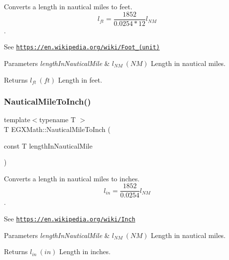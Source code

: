 Converts a length in nautical miles to feet. \[ l_{ft}= \frac{1852}{0.0254 * 12} l_{NM} \]. 

See \href{https://en.wikipedia.org/wiki/Foot_(unit)}{\tt https\+://en.\+wikipedia.\+org/wiki/\+Foot\+\_\+(unit)} 
\begin{DoxyParams}{Parameters}
{\em length\+In\+Nautical\+Mile} & $ l_{NM}\ (NM)$ Length in nautical miles. \\
\hline
\end{DoxyParams}
\begin{DoxyReturn}{Returns}
$ l_{ft}\ (ft)$ Length in feet. 
\end{DoxyReturn}
\mbox{\label{group___e_g_x_math-_conversions-_length_conversions-_non-_s_i-_nautical_mile-_imperial_ga5ec58ed7dbd23bcfb8290e1e476f354b}} 
\subsubsection{\texorpdfstring{Nautical\+Mile\+To\+Inch()}{NauticalMileToInch()}}
{\footnotesize\ttfamily template$<$typename T $>$ \\
T E\+G\+X\+Math\+::\+Nautical\+Mile\+To\+Inch (\begin{DoxyParamCaption}\item[{const T}]{length\+In\+Nautical\+Mile }\end{DoxyParamCaption})}



Converts a length in nautical miles to inches. \[ l_{in}= \frac{1852}{0.0254} l_{NM} \]. 

See \href{https://en.wikipedia.org/wiki/Inch}{\tt https\+://en.\+wikipedia.\+org/wiki/\+Inch} 
\begin{DoxyParams}{Parameters}
{\em length\+In\+Nautical\+Mile} & $ l_{NM}\ (NM)$ Length in nautical miles. \\
\hline
\end{DoxyParams}
\begin{DoxyReturn}{Returns}
$ l_{in}\ (in)$ Length in inches. 
\end{DoxyReturn}
\mbox{\label{group___e_g_x_math-_conversions-_length_conversions-_non-_s_i-_nautical_mile-_imperial_ga30322f1dff254ba1eff05b0d10617fe7}} 
